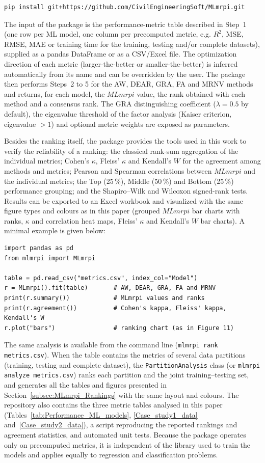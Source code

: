 \begin{verbatim}
pip install git+https://github.com/CivilEngineeringSoft/MLmrpi.git
\end{verbatim}

The input of the package is the performance-metric table described in Step~1
(one row per ML model, one column per precomputed metric, e.g. $R^2$, MSE, RMSE,
MAE or training time for the training, testing and/or complete datasets), supplied
as a pandas DataFrame or as a CSV/Excel file. The optimization direction of each
metric (larger-the-better or smaller-the-better) is inferred automatically from its
name and can be overridden by the user. The package then performs Steps~2 to 5 for
the AW, DEAR, GRA, FA and MRNV methods and returns, for each model, the $MLmrpi$
value, the rank obtained with each method and a consensus rank. The GRA
distinguishing coefficient ($\lambda=0.5$ by default), the eigenvalue threshold of
the factor analysis (Kaiser criterion, eigenvalue $>1$) and optional metric weights
are exposed as parameters.

Besides the ranking itself, the package provides the tools used in this work to
verify the reliability of a ranking: the classical rank-sum aggregation of the
individual metrics; Cohen's $\kappa$, Fleiss' $\kappa$ and Kendall's $W$ for
the agreement among methods and metrics; Pearson and Spearman correlations between
$MLmrpi$ and the individual metrics; the Top (25\,\%), Middle (50\,\%) and Bottom
(25\,\%) performance grouping;
and the Shapiro--Wilk and Wilcoxon signed-rank tests. Results can be exported to
an Excel workbook and visualized with the same figure types and colours as in
this paper (grouped $MLmrpi$ bar charts with ranks, $\kappa$ and correlation heat
maps, Fleiss' $\kappa$ and Kendall's $W$ bar charts). A minimal example is given below:

\begin{verbatim}
import pandas as pd
from mlmrpi import MLmrpi

table = pd.read_csv("metrics.csv", index_col="Model")
r = MLmrpi().fit(table)       # AW, DEAR, GRA, FA and MRNV
print(r.summary())            # MLmrpi values and ranks
print(r.agreement())          # Cohen's kappa, Fleiss' kappa, Kendall's W
r.plot("bars")                # ranking chart (as in Figure 11)
\end{verbatim}

The same analysis is available from the command line
(\texttt{mlmrpi rank metrics.csv}). When the table contains the metrics of several
data partitions (training, testing and complete dataset), the \texttt{PartitionAnalysis}
class (or \texttt{mlmrpi analyze metrics.csv}) ranks each partition and the joint
training--testing set, and generates all the tables and figures presented in
Section~\ref{subsec:MLmrpi_Rankings} with the same layout and colours. The repository also contains the three
metric tables analysed in this paper (Tables~\ref{tab:Performance_ML_models},
\ref{Case_study1_data} and~\ref{Case_study2_data}), a script reproducing the
reported rankings and agreement statistics, and automated unit tests. Because the
package operates only on precomputed metrics, it is independent of the library used
to train the models and applies equally to regression and classification problems.

